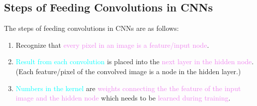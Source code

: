 \documentclass{book}
\begin{document}
\subsection{Steps of Feeding Convolutions in CNNs}
The steps of feeding convolutions in CNNs are as follows:
\begin{enumerate}
    \item Recognize that \textcolor{violet}{every pixel in an image is a feature/input node}.
    \item \textcolor{cyan}{Result from each convolution} is placed into the \textcolor{violet}{next layer in the hidden node}.\\
    (Each feature/pixel of the convolved image is a node in the hidden layer.)
    \item \textcolor{cyan}{Numbers in the kernel} are \textcolor{violet}{weights connecting the the feature of the input image and the hidden node} which needs to be \textcolor{violet}{learned during training}.
\end{enumerate}
\newpage
\end{document}
